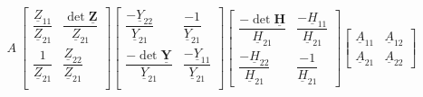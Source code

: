 \[
    A\
    \begin{bmatrix}
        \dfrac{\underline{Z}_{11}}{\underline{Z}_{21}} & \dfrac{\operatorname{det}\underline{\boldsymbol{Z}}}{\underline{Z}_{21}}\\
        \dfrac{1}{\underline{Z}_{21}} & \dfrac{\underline{{Z}}_{22}}{\underline{Z}_{21}} \\
    \end{bmatrix}
    \begin{bmatrix}
        \dfrac{-\underline{Y}_{22}}{\underline{Y}_{21}} & \dfrac{-1}{\underline{Y}_{21}}\\
        \dfrac{-\operatorname{det}\underline{\boldsymbol{Y}}}{\underline{Y}_{21}} & \dfrac{-\underline{{Y}}_{11}}{\underline{Y}_{21}} \\
    \end{bmatrix}
    \begin{bmatrix}
        \dfrac{-\operatorname{det}\underline{\boldsymbol{{H}}}}{\underline{H}_{21}} & \dfrac{-\underline{H}_{11}}{\underline{H}_{21}} \\
        \dfrac{-\underline{H}_{22}}{\underline{H}_{21}} & \dfrac{-1}{\underline{H}_{21}}
    \end{bmatrix}
    \begin{bmatrix}
        \underline{A}_{11} & \underline{A}_{12}\\
        \underline{A}_{21} & \underline{A}_{22}
    \end{bmatrix}
\]
\endgroup
